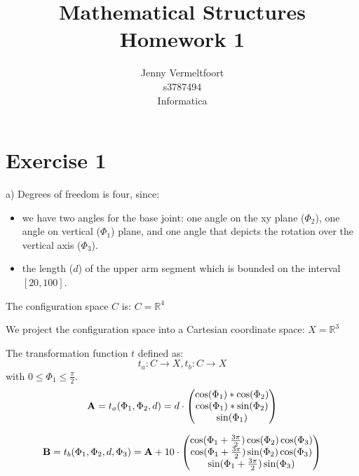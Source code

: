 \documentclass{article}
\title{Mathematical Structures Homework 1}
\author{Jenny Vermeltfoort\\
  s3787494\\
  Informatica%
}
\begin{document}
\renewcommand*{\phi}{\varphi}
\renewcommand*{\epsilon}{\varepsilon}

\maketitle

\section*{Exercise 1}
a)
Degrees of freedom is four, since:
\begin{itemize}
  \item we have two angles for the base joint: one angle on the xy plane ($\Phi_{2}$), one angle on vertical ($\Phi_{1}$) plane, and one angle that depicts the rotation over the vertical axis ($\Phi_3$).
  \item the length ($d$) of the upper arm segment which is bounded on the interval $[20, 100]$.
\end{itemize} 

The configuration space $C$ is:
$C = \mathbb{R}^4 $

We project the configuration space into a Cartesian coordinate space:
$X = \mathbb{R}^3$

The transformation function $t$ defined as:
\begin{equation}
  t_a: C \rightarrow X, t_b: C \rightarrow X
\end{equation}
with $ 0 \leq \Phi_{1} \leq \frac{\pi}{2} $.
\begin{equation}
  \mathbf{A} = t_a(\Phi_{1}, \Phi_{2}, d) = \\
  d \cdot \begin{pmatrix}
    \cos(\Phi_{1}) * \cos(\Phi_{2}) \\
    \cos(\Phi_{1}) * \sin(\Phi_{2}) \\
    \sin(\Phi_{1}) \\
  \end{pmatrix}
\end{equation}

\begin{equation}
  \mathbf{B} = t_b(\Phi_{1}, \Phi_{2}, d, \Phi_{3}) = \mathbf{A} + \\
  10 \cdot \begin{pmatrix}
  \cos(\Phi_{1} + \frac{3\pi}{2}) \cos(\Phi_{2}) \cos(\Phi_{3}) \\
  \cos(\Phi_{1} + \frac{3\pi}{2}) \sin(\Phi_{2}) \cos(\Phi_{3}) \\
  \sin(\Phi_{1} + \frac{3\pi}{2}) \sin(\Phi_{3}) \\
  \end{pmatrix}
\end{equation}
\end{document}
